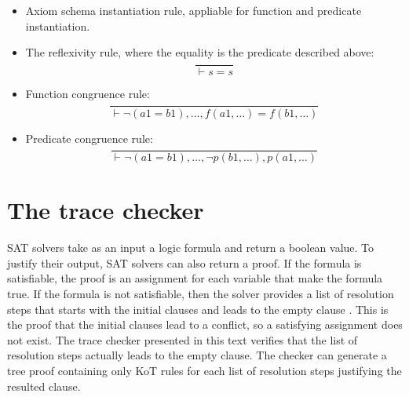 \documentclass[a4paper,12pt]{article}
\begin{document}
\begin{itemize}
\item Axiom schema instantiation rule, appliable for function and predicate instantiation.

\item The reflexivity rule, where the equality is the predicate described above:
\begin{equation}
\frac{}{\vdash s=s} 
\end{equation}

\item Function congruence rule:
\begin{equation}
 \frac{}{\vdash \neg (a1 = b1), \ldots, f(a1, \ldots) = f(b1,\ldots)}
\end{equation}

\item Predicate congruence rule:
\begin{equation}
 \frac{}{\vdash \neg (a1 = b1), \ldots, \neg p(b1, \ldots), p(a1, \ldots) }
\end{equation}

\end{itemize}

\section{The trace checker}
SAT solvers take as an input a logic formula and return a boolean value. To justify their output, SAT solvers can also return a
proof. If the formula is satisfiable, the proof is an assignment for each variable that make the formula true. If the formula 
is not satisfiable, then the solver provides a list of resolution steps that starts with the initial clauses and leads to 
the empty clause \cite{zhang}. This is the proof that the initial clauses lead to a conflict, so a satisfying assignment does not exist.
The trace checker presented in this text verifies that the list of resolution steps actually leads to the empty clause. 
The checker can generate a tree proof containing only KoT rules for each list of resolution steps justifying the resulted clause.
\end{document}
